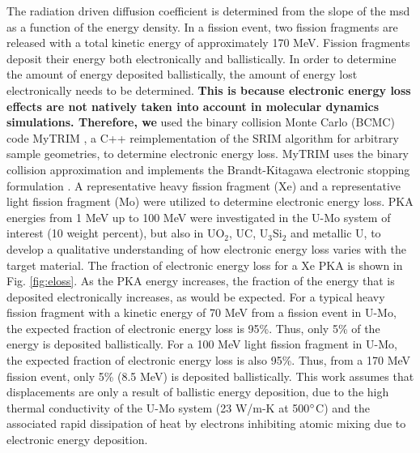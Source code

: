 \documentclass[review]{elsarticle}
\providecommand{\DIFaddtex}[1]{{\bf #1}} %
\providecommand{\DIFdeltex}[1]{} %
\providecommand{\DIFaddbegin}{\protect\color{blue}} %
\providecommand{\DIFaddend}{\protect\color{black}} %
\providecommand{\DIFdelbegin}{\protect\color{red}} %
\providecommand{\DIFdelend}{\protect\color{black}} %
\providecommand{\DIFadd}[1]{\texorpdfstring{\DIFaddtex{#1}}{#1}} %
\providecommand{\DIFdel}[1]{\texorpdfstring{\DIFdeltex{#1}}{}} %
\newcommand{\DIFscaledelfig}{0.5}
\newlength{\DIFdelgraphicswidth} %
\newlength{\DIFdelgraphicsheight} %
\newcommand{\DIFaddincludegraphics}[2][]{{\color{blue}\fbox{\DIFOincludegraphics[#1]{#2}}}} %
\newcommand{\DIFdelincludegraphics}[2][]{%
\sbox{\DIFdelgraphicsbox}{\DIFOincludegraphics[#1]{#2}}%
\settoboxwidth{\DIFdelgraphicswidth}{\DIFdelgraphicsbox} %
\settoboxtotalheight{\DIFdelgraphicsheight}{\DIFdelgraphicsbox} %
\scalebox{\DIFscaledelfig}{%
\parbox[b]{\DIFdelgraphicswidth}{\usebox{\DIFdelgraphicsbox}\\[-\baselineskip] \rule{\DIFdelgraphicswidth}{0em}}\llap{\resizebox{\DIFdelgraphicswidth}{\DIFdelgraphicsheight}{%
\setlength{\unitlength}{\DIFdelgraphicswidth}%
\begin{picture}(1,1)%
\thicklines\linethickness{2pt} %
{\color[rgb]{1,0,0}\put(0,0){\framebox(1,1){}}}%
{\color[rgb]{1,0,0}\put(0,0){\line( 1,1){1}}}%
{\color[rgb]{1,0,0}\put(0,1){\line(1,-1){1}}}%
\end{picture}%
}\hspace*{3pt}}} %
} %
\DeclareRobustCommand{\DIFaddbegin}{\DIFOaddbegin \let\includegraphics\DIFaddincludegraphics} %
\DeclareRobustCommand{\DIFaddend}{\DIFOaddend \let\includegraphics\DIFOincludegraphics} %
\DeclareRobustCommand{\DIFdelbegin}{\DIFOdelbegin \let\includegraphics\DIFdelincludegraphics} %
\DeclareRobustCommand{\DIFdelend}{\DIFOaddend \let\includegraphics\DIFOincludegraphics} %
\begin{document}
The radiation driven diffusion coefficient is determined from the slope of the msd as a function of the energy density. In a fission event, two fission fragments are released with a total kinetic energy of approximately 170 MeV. Fission fragments deposit their energy both electronically and ballistically. In order to determine the amount of energy deposited ballistically, the amount of energy lost electronically needs to be determined. \DIFdelbegin \DIFdel{We }\DIFdelend \DIFaddbegin \DIFadd{This is because electronic energy loss effects are not natively taken into account in molecular dynamics simulations. Therefore, we }\DIFaddend used the binary collision Monte Carlo (BCMC) code MyTRIM \cite{myTRIM}, a C++ reimplementation of the SRIM algorithm for arbitrary sample geometries, to determine electronic energy loss. MyTRIM uses the binary collision approximation and implements the Brandt-Kitagawa electronic stopping formulation \cite{brandt1982}. A representative heavy fission fragment (Xe) and a representative light fission fragment (Mo) were utilized to determine electronic energy loss. PKA energies from 1 MeV up to 100 MeV were investigated in the U-Mo system of interest (10 weight percent), but also in UO$_2$, UC, U$_3$Si$_2$ and metallic U, to develop a qualitative understanding of how electronic energy loss varies with the target material. The fraction of electronic energy loss for a Xe PKA is shown in Fig. \ref{fig:eloss}. As the PKA energy increases, the fraction of the energy that is deposited electronically increases, as would be expected. For a typical heavy fission fragment with a kinetic energy of 70 MeV from a fission event in U-Mo, the expected fraction of electronic energy loss is 95\%. Thus, only 5\% of the energy is deposited ballistically. For a 100 MeV light fission fragment in U-Mo, the expected fraction of electronic energy loss is also 95\%. Thus, from a 170 MeV fission event, only 5\% (8.5 MeV) is deposited ballistically. This work assumes that displacements are only a result of ballistic energy deposition, due to the high thermal conductivity of the U-Mo system (23 W/m-K at 500$\degree$C) \cite{umo_handbook} and the associated rapid dissipation of heat by electrons inhibiting atomic mixing due to electronic energy deposition. 
\end{document}
